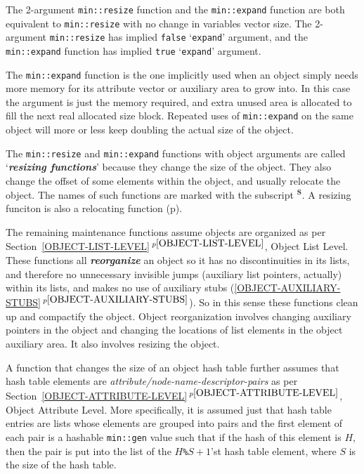 \documentclass[12pt]{article}
\makeatletter
\newcommand{\skey}[2]{{\bf \em #1#2}\index{#1}}
\newcommand{\ikey}[2]{{\bf \em #1}\index{#2}}
\newcommand{\subsmkey}[2]{$\mathbf{^{#1}}$\index{#1@$^{#1}$!#2}}
\newcommand{\itemref}[1]{\ref{#1}$\,^{p\pageref{#1}}$}
\newcommand{\pagref}[1]{p\pageref{#1}}
\newcommand{\EOL}{\penalty \exhyphenpenalty}
\makeatother
\begin{document}
The 2-argument {\tt min::resize} function and the {\tt min::\EOL expand}
function are both equivalent to {\tt min::\EOL resize} with no change
in variables vector size.  The 2-argument {\tt min::\EOL resize}
has implied {\tt false} `{\tt expand}' argument, and the
{\tt min::\EOL expand} function has implied {\tt true} `{\tt expand}'
argument.

The {\tt min::expand} function is the one implicitly used when an object simply
needs more memory for its attribute vector or auxiliary area to grow into.
In this case the argument is just the memory required, and extra unused
area is allocated to fill the next real allocated size block.  Repeated
uses of {\tt min::expand} on the same object will more or less keep
doubling the actual size of the object.

The {\tt min::resize} and {\tt min::expand} functions with object arguments
are called `\skey{resizing function}s'\label{RESIZING-FUNCTIONS}
because they change the size of the object.  They also change
the offset of some elements within the object, and usually
relocate the object.
The names of such functions are marked with the subscript
\subsmkey{S}{of function}.  A resizing funciton is also
a relocating function (\pagref{RELOCATING-FUNCTIONS}).

The remaining maintenance functions assume objects are organized
as per Section~\itemref{OBJECT-LIST-LEVEL}, Object List Level.
These functions all \ikey{reorganize}{object}
an object so it has no discontinuities
in its lists, and therefore no unnecessary invisible jumps (auxiliary
list pointers, actually) within its lists, and makes no use of
auxiliary stubs (\itemref{OBJECT-AUXILIARY-STUBS}).  So in this
sense these functions clean up and compactify the object.  Object
reorganization involves changing auxiliary pointers in the object and
changing the locations of list elements in the object auxiliary area.
It also involves resizing the object.

A function that changes the size of an object hash table further
assumes that hash table elements are {\em attribute/node-name-descriptor-pairs}
as per Section~\itemref{OBJECT-ATTRIBUTE-LEVEL}, Object Attribute Level.
More specifically, it is assumed just that hash table entries are lists
whose elements are grouped into pairs and the first element of each
pair is a hashable {\tt min::gen} value such that if the hash of this
element is $H$, then the pair is put into the list of the $H$\verb|%|$S+1$'st
hash table element, where $S$ is the size of the hash table.
\end{document}
